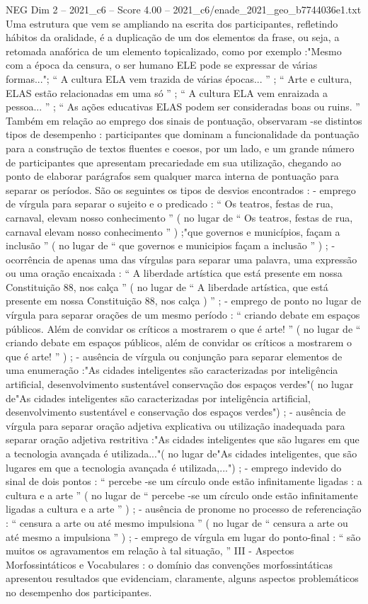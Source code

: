\begin{textsample}{NEG Dim 2 – 2021\_c6 – Score 4.00 – 2021\_c6/enade\_2021\_geo\_b7744036e1.txt}
Uma estrutura que vem se ampliando na escrita dos participantes, refletindo hábitos da oralidade, é a duplicação de um dos elementos da frase, ou seja, a retomada anafórica de um elemento topicalizado, como por exemplo :"Mesmo com a época da censura, o ser humano ELE pode se expressar de várias formas..."; “ A cultura ELA vem trazida de várias épocas... ” ; “ Arte e cultura, ELAS estão relacionadas em uma só ” ; “ A cultura ELA vem enraizada a pessoa... ” ; “ As ações educativas ELAS podem ser consideradas boas ou ruins. ” Também em relação ao emprego dos sinais de pontuação, observaram -se distintos tipos de desempenho : participantes que dominam a funcionalidade da pontuação para a construção de textos fluentes e coesos, por um lado, e um grande número de participantes que apresentam precariedade em sua utilização, chegando ao ponto de elaborar parágrafos sem qualquer marca interna de pontuação para separar os períodos.
São os seguintes os tipos de desvios encontrados : - emprego de vírgula para separar o sujeito e o predicado : “ Os teatros, festas de rua, carnaval, elevam nosso conhecimento ” ( no lugar de “ Os teatros, festas de rua, carnaval elevam nosso conhecimento ” ) ;"que governos e municípios, façam a inclusão ” ( no lugar de “ que governos e municipios façam a inclusão ” ) ; - ocorrência de apenas uma das vírgulas para separar uma palavra, uma expressão ou uma oração encaixada : “ A liberdade artística que está presente em nossa Constituição 88, nos calça ” ( no lugar de “ A liberdade artística, que está presente em nossa Constituição 88, nos calça ) ” ; - emprego de ponto no lugar de vírgula para separar orações de um mesmo período : “ criando debate em espaços públicos.
Além de convidar os críticos a mostrarem o que é arte! ” ( no lugar de “ criando debate em espaços públicos, além de convidar os críticos a mostrarem o que é arte! ” ) ; - ausência de vírgula ou conjunção para separar elementos de uma enumeração :"As cidades inteligentes são caracterizadas por inteligência artificial, desenvolvimento sustentável conservação dos espaços verdes"( no lugar de"As cidades inteligentes são caracterizadas por inteligência artificial, desenvolvimento sustentável e conservação dos espaços verdes") ; - ausência de vírgula para separar oração adjetiva explicativa ou utilização inadequada para separar oração adjetiva restritiva :"As cidades inteligentes que são lugares em que a tecnologia avançada é utilizada..."( no lugar de"As cidades inteligentes, que são lugares em que a tecnologia avançada é utilizada,...") ; - emprego indevido do sinal de dois pontos : “ percebe -se um círculo onde estão infinitamente ligadas : a cultura e a arte ” ( no lugar de “ percebe -se um círculo onde estão infinitamente ligadas a cultura e a arte ” ) ; - ausência de pronome no processo de referenciação : “ censura a arte ou até mesmo impulsiona ” ( no lugar de “ censura a arte ou até mesmo a impulsiona ” ) ; - emprego de vírgula em lugar do ponto-final : “ são muitos os agravamentos em relação à tal situação, ” III - Aspectos Morfossintáticos e Vocabulares : o domínio das convenções morfossintáticas apresentou resultados que evidenciam, claramente, alguns aspectos problemáticos no desempenho dos participantes.

\end{textsample}
